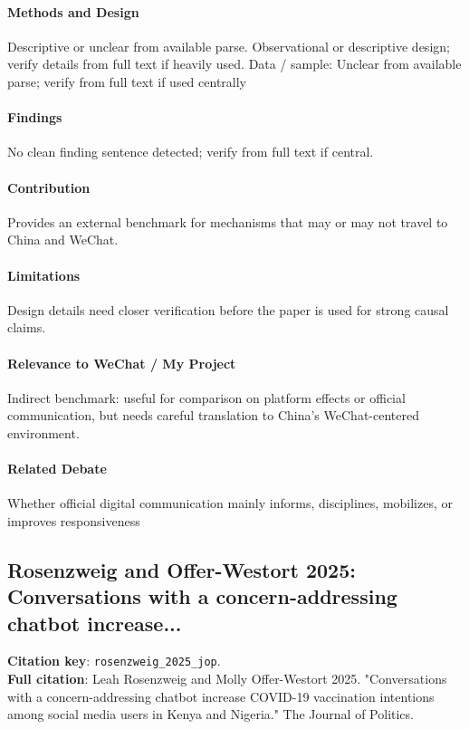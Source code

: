 \documentclass[12pt]{article}
\begin{document}
\paragraph{Methods and Design} Descriptive or unclear from available parse. Observational or descriptive design; verify details from full text if heavily used. Data / sample: Unclear from available parse; verify from full text if used centrally

\paragraph{Findings} No clean finding sentence detected; verify from full text if central.

\paragraph{Contribution} Provides an external benchmark for mechanisms that may or may not travel to China and WeChat.

\paragraph{Limitations} Design details need closer verification before the paper is used for strong causal claims.

\paragraph{Relevance to WeChat / My Project} Indirect benchmark: useful for comparison on platform effects or official communication, but needs careful translation to China's WeChat-centered environment.

\paragraph{Related Debate} Whether official digital communication mainly informs, disciplines, mobilizes, or improves responsiveness


\subsection{Rosenzweig and Offer-Westort 2025: Conversations with a concern-addressing chatbot increase...}
\textbf{Citation key}: \texttt{rosenzweig\_2025\_jop}.\\
\textbf{Full citation}: Leah Rosenzweig and Molly Offer-Westort 2025. "Conversations with a concern-addressing chatbot increase COVID-19 vaccination intentions among social media users in Kenya and Nigeria." The Journal of Politics.
\end{document}
